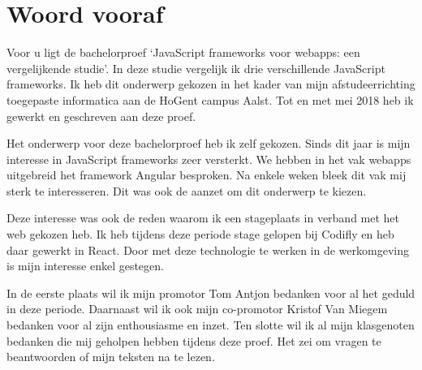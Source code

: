 
\chapter*{Woord vooraf}
\label{ch:voorwoord}

Voor u ligt de bachelorproef ‘JavaScript frameworks voor webapps: een vergelijkende studie’. In deze studie vergelijk ik drie verschillende JavaScript frameworks. Ik heb dit onderwerp gekozen in het kader van mijn afstudeerrichting toegepaste informatica aan de HoGent campus Aalst. Tot en met mei 2018 heb ik gewerkt en geschreven aan deze proef.

Het onderwerp voor deze bachelorproef heb ik zelf gekozen. Sinds dit jaar is mijn interesse in JavaScript frameworks zeer versterkt. We hebben in het vak webapps uitgebreid het framework Angular besproken. Na enkele weken bleek dit vak mij sterk te interesseren. Dit was ook de aanzet om dit onderwerp te kiezen.

Deze interesse was ook de reden waarom ik een stageplaats in verband met het web gekozen heb. Ik heb tijdens deze periode stage gelopen bij Codifly en heb daar gewerkt in React. Door met deze technologie te werken in de werkomgeving is mijn interesse enkel gestegen.

In de eerste plaats wil ik mijn promotor Tom Antjon bedanken voor al het geduld in deze periode. Daarnaast wil ik ook mijn co-promotor Kristof Van Miegem bedanken voor al zijn enthousiasme en inzet. Ten slotte wil ik al mijn klasgenoten bedanken die mij geholpen hebben tijdens deze proef. Het zei om vragen te beantwoorden of mijn teksten na te lezen.


